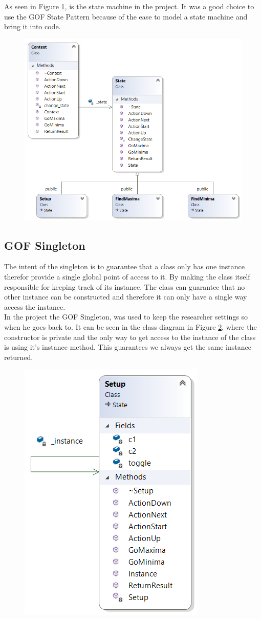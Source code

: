 As seen in Figure \ref{fig:statemachine}, is the state machine in the project. It was a good choice to use the GOF State Pattern because of the ease to model a state machine and bring it into code. 

\begin{figure}[h]
	\centering
	\includegraphics[width=0.7\linewidth]{diagram/StateMachine}
	\caption{}
	\label{fig:statemachine}
\end{figure}

\subsection{GOF Singleton}
The intent of the singleton is to guarantee that a class only has one instance therefor provide a single global point of access to it. By making the class itself responsible for keeping track of its instance. The class can guarantee that no other instance can be constructed and therefore it can only have a single way access the instance.
\\
In the project the GOF Singleton, was used to keep the researcher settings so when he goes back to. It can be seen in the class diagram in Figure \ref{fig:singleton}, where the constructor is private and the only way to get access to the instance of the class is using it's instance method. This guarantees we always get the same instance returned.

\begin{figure}[h]
	\centering
	\includegraphics[width=0.4\linewidth]{diagram/singleton}
	\caption[Gof Singleton]{}
	\label{fig:singleton}
\end{figure}

